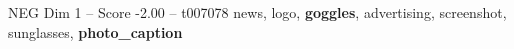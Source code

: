 \begin{textsample}{NEG Dim 1 – Score -2.00 – t007078}  \label{ex:f1_neg_012}
news, logo, \textbf{goggles}, advertising, screenshot, sunglasses, \textbf{photo\_caption}

\end{textsample}
